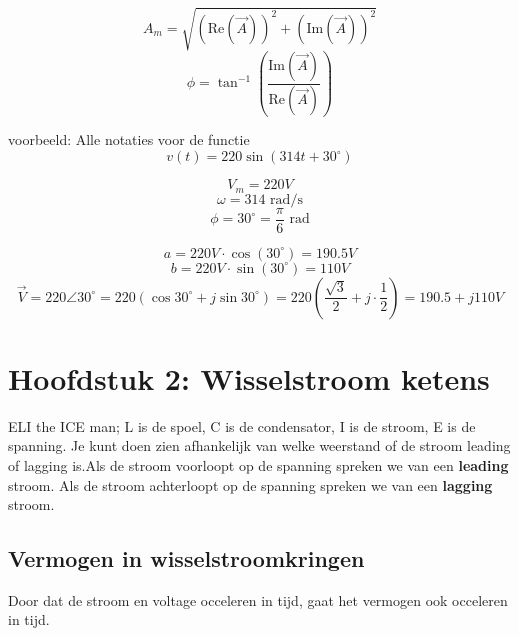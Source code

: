 \documentclass[a4paper,11pt]{article}
\begin{document}
\[A_m = \sqrt{(\text{Re}(\vec{A}))^2 + (\text{Im}(\vec{A}))^2}\]
\[\phi = \tan^{-1}\left(\frac{\text{Im}(\vec{A})}{\text{Re}(\vec{A})}\right)\]


voorbeeld: Alle notaties voor de functie $$v(t) = 220 \sin(314t + 30^\circ)$$

\[V_m = 220 V\]
\[\omega = 314 \text{ rad/s}\]
\[\phi = 30^\circ = \frac{\pi}{6} \text{ rad}\]

\[a = 220V \cdot \cos(30^\circ) = 190.5 V\]
\[b = 220V \cdot \sin(30^\circ) = 110 V\]
\[\vec{V} = 220 \angle 30^\circ = 220 (\cos 30^\circ + j \sin 30^\circ) =
 220 \left(\frac{\sqrt{3}}{2} + j \cdot \frac{1}{2}\right) = 190.5 + j 110 V\]

\section{Hoofdstuk 2: Wisselstroom ketens}

ELI the ICE man; L is de spoel, C is de condensator, I is de stroom, E is de spanning. Je kunt doen zien afhankelijk van 
welke weerstand of de stroom leading of lagging is.Als de stroom voorloopt op de spanning spreken we van een \textbf{leading} stroom.
Als de stroom achterloopt op de spanning spreken we van een \textbf{lagging} stroom.






\subsection{Vermogen in wisselstroomkringen}
Door dat de stroom en voltage occeleren in tijd, gaat
het vermogen ook occeleren in tijd.
\end{document}
